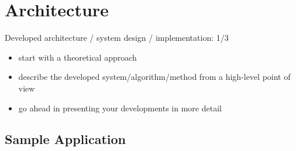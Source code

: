 \chapter{Architecture}

Developed architecture / system design / implementation: 1/3

\begin{itemize}
\item start with a theoretical approach
\item describe the developed system/algorithm/method from a high-level point of view
\item go ahead in presenting your developments in more detail
\end{itemize}

\section{Sample Application}
